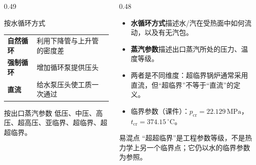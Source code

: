 \begin{frame}[t,shrink]{}
\begin{columns}[T,onlytextwidth]
\begin{column}{0.49\textwidth}
  \begin{keybox}{按水循环方式}
  \small
  \begin{tabularx}{\linewidth}{@{}>{\bfseries}p{14mm}X@{}}
    自然循环 & 利用下降管与上升管的密度差\\
    强制循环 & 增加循环泵提供压头\\
    直流 & 给水泵压头使工质一次通过\\
  \end{tabularx}
  \end{keybox}
  \vspace{1mm}
  \begin{keybox}{按出口蒸汽参数}
  \small 低压、中压、高压、超高压、亚临界、超临界、超超临界。
  \end{keybox}
\end{column}
\begin{column}{0.48\textwidth}
  \begin{itemize}
    \item \textbf{水循环方式}描述水/汽在受热面中如何流动，以及有无汽包。
    \item \textbf{蒸汽参数}描述出口蒸汽所处的压力、温度等级。
    \item 两者是不同维度：超临界锅炉通常采用直流，但“超临界”不等于“直流”的定义。
    \item 临界参数（课件）：\(p_{\mathrm{cr}}=22.129\,\mathrm{MPa}\)，\(t_{\mathrm{cr}}=374.15\,\mathrm{^\circ C}\)。
  \end{itemize}
  \vspace{0.5mm}
  \begin{amberbox}{易混点}
  \small “超超临界”是工程参数等级，不是热力学上另一个临界点；它仍以水的临界参数为参照。
  \end{amberbox}
\end{column}
\end{columns}
\end{frame}

